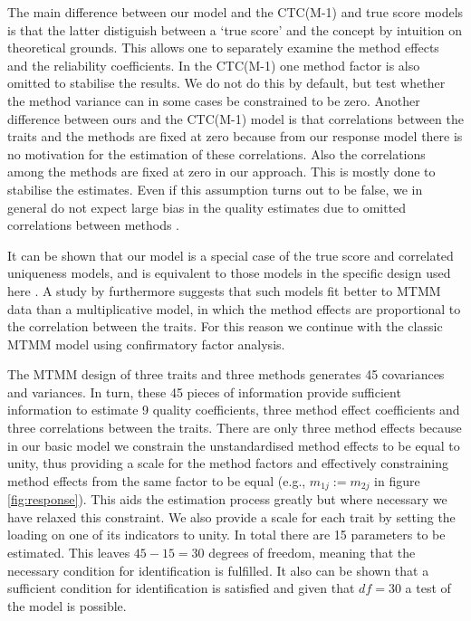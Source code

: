 \documentclass[a4paper,12pt]{article}
\begin{document}
The main difference between our model and the CTC(M-1) and true score models is that the latter distiguish between a `true score' and the concept by intuition on theoretical grounds. This allows one to separately examine the method effects and the reliability coefficients. In the CTC(M-1) one method factor is also omitted to stabilise the results. We do not do this by default, but test whether the method variance can in some cases be constrained to be zero. Another difference between ours and the CTC(M-1) model is that correlations between the traits and the methods are fixed at zero because from our response model there is no motivation for the estimation of these correlations. Also the correlations among the methods are fixed at zero in our approach. This is mostly done to stabilise the estimates. Even if this assumption turns out to be false, we in general do not expect large bias in the quality estimates due to omitted correlations between methods \citep{corten_fit_2002}. 

It can be shown that our model is a special case of the true score and correlated uniqueness models, and is equivalent to those models in the specific design used here \citep{coenders_relationship_1998}.  A study by \citet{corten_fit_2002} furthermore suggests that such models fit better to MTMM data than a multiplicative model, in which the method effects are proportional to the correlation between the traits. For this reason we continue with the classic MTMM model using confirmatory factor analysis.

The MTMM design of three traits and three methods generates 45 covariances and variances. In turn, these 45 pieces of information provide sufficient information to estimate 9 quality coefficients, three method effect coefficients and three correlations between the traits. There are only three method effects because in our basic model we constrain the unstandardised method effects to be equal to unity, thus providing a scale for the method factors and effectively constraining  method effects from the same factor to be equal (e.g., $m_{1j} := m_{2j}$ in figure \ref{fig:response}). This aids the estimation process greatly but where necessary we have relaxed this constraint. We also provide a scale for each trait by setting the loading on one of its indicators to unity. In total there are 15 parameters to be estimated. This leaves $45 - 15 = 30$ degrees of freedom, meaning that the necessary condition for identification is fulfilled. It also can be shown that a sufficient condition for identification is satisfied and given that $df=30$ a test of the model is possible.%
\end{document}
